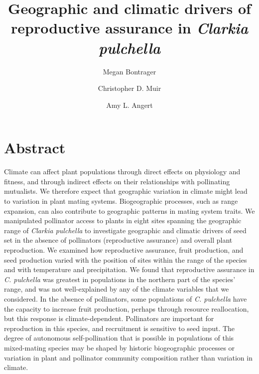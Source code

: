 \documentclass{article}
\begin{document}
\title{Geographic and climatic drivers of reproductive assurance in \textit{Clarkia pulchella}}
\author[1,4]{Megan Bontrager}
\author[2]{Christopher D. Muir}
\author[3]{Amy L. Angert}
\date{}
\maketitle



\newpage

\linenumbers

\section*{Abstract}

Climate can affect plant populations through direct effects on physiology and fitness, and through indirect effects on their relationships with pollinating mutualists. We therefore expect that geographic variation in climate might lead to variation in plant mating systems. Biogeographic processes, such as range expansion, can also contribute to geographic patterns in mating system traits. We manipulated pollinator access to plants in eight sites spanning the geographic range of \textit{Clarkia pulchella} to investigate geographic and climatic drivers of seed set in the absence of pollinators (reproductive assurance) and overall plant reproduction. We examined how reproductive assurance, fruit production, and seed production varied with the position of sites within the range of the species and with temperature and precipitation. We found that reproductive assurance in \textit{C. pulchella} was greatest in populations in the northern part of the species' range, and was not well-explained by any of the climate variables that we considered. In the absence of pollinators, some populations of \textit{C. pulchella} have the capacity to increase fruit production, perhaps through resource reallocation, but this response is climate-dependent. Pollinators are important for reproduction in this species, and recruitment is sensitive to seed input. The degree of autonomous self-pollination that is possible in populations of this mixed-mating species may be shaped by historic biogeographic processes or variation in plant and pollinator community composition rather than variation in climate.
\end{document}
